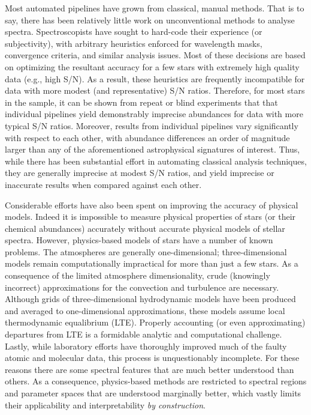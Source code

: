 \documentclass[12pt,preprint]{aastex}
\begin{document}
Most automated pipelines have grown from classical, manual methods.  That is to
say, there has been relatively little work on unconventional methods to analyse
spectra.  Spectroscopists have sought to hard-code their experience (or subjectivity),
with arbitrary heuristics enforced for wavelength masks, convergence
criteria, and similar analysis issues.  Most of these decisions are based on optimizing the resultant
accuracy for a few stars with extremely high quality data (e.g., high S/N).  As
a result, these heuristics are frequently incompatible for data with more
modest (and representative) S/N ratios.  Therefore, for most stars in the sample,
it can be shown from repeat or blind experiments that that individual
pipelines yield demonstrably imprecise abundances for data with more typical S/N ratios.
Moreover, results from individual pipelines vary 
significantly with respect to each other, with abundance differences an order
of magnitude larger than any of the aforementioned astrophysical signatures of interest.
Thus, while there has been substantial effort in automating classical analysis
techniques, they are generally imprecise at modest S/N ratios, and yield
imprecise or inaccurate results when compared against each other.


Considerable efforts have also been spent on improving the accuracy of physical
models.  Indeed it is impossible to measure physical properties of stars (or 
their chemical abundances) accurately without accurate physical models of 
stellar spectra.  However, physics-based models of stars have a number of known
problems.  The atmospheres are generally one-dimensional; three-dimensional
models remain computationally impractical for more than just a few stars.  As a
consequence of the limited atmosphere dimensionality, crude (knowingly 
incorrect) approximations for the convection and turbulence are necessary. 
Although grids of three-dimensional hydrodynamic models have been produced 
and averaged to one-dimensional approximations, these models assume local
thermodynamic equalibrium (LTE).  Properly accounting (or even approximating) 
departures from LTE is a formidable analytic and computational challenge.
Lastly, while laboratory efforts have thoroughly improved much of the faulty
atomic and molecular data, this process is unquestionably incomplete. For these
reasons there are some spectral features that are much better understood than
others.  As a consequence, physics-based methods are restricted to spectral
regions and parameter spaces that are understood marginally better, which vastly
limits their applicability and interpretability \emph{by construction}.
\end{document}
